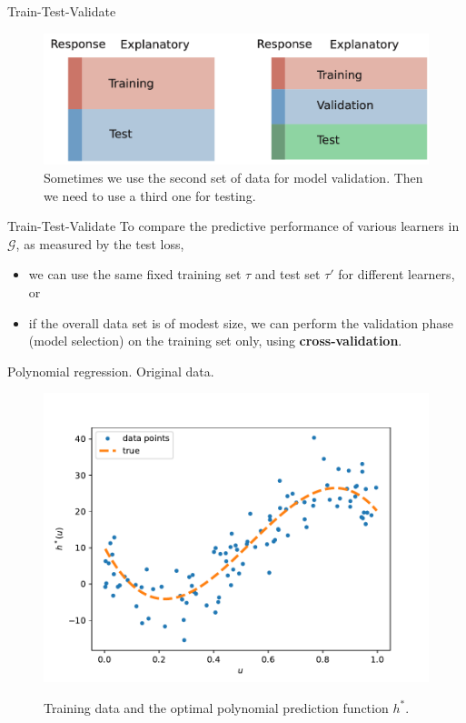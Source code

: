 \documentclass{beamer}
\begin{document}
\begin{frame}{Train-Test-Validate}
  \begin{figure}
    \includegraphics[width=0.7\linewidth]{traintestvalidate}
    \caption{Sometimes we use the second set of data for model validation. Then we need to use a third one for testing.}
    \label{fig:ttv}
  \end{figure}
\end{frame}

\begin{frame}{Train-Test-Validate}
  To compare the predictive performance of various learners in $\mathcal{G}$, as measured by the test loss,
  \begin{itemize}
    \item  we can use the same fixed training set $\tau$ and test set $\tau'$ for different learners, or
    \item if the overall data set is of modest size, we can perform the validation phase (model selection) on the training set only, using {\bf cross-validation}. 
  \end{itemize}

\end{frame}

\begin{frame}{Polynomial regression. Original data.}
  \begin{figure}
    \includegraphics[width=0.7\linewidth]{polydatpy}
    \label{fig:polydatpy}
    \caption{Training data and the optimal polynomial prediction function $h^*$\cite{kroese2020}.}
  \end{figure}
\end{frame}
\end{document}
